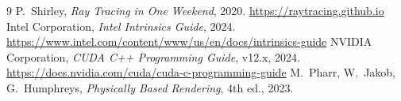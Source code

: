 \documentclass[conference]{IEEEtran}
\begin{document}
\begin{thebibliography}{9}
  P.\ Shirley, \textit{Ray Tracing in One Weekend}, 2020.
  \url{https://raytracing.github.io}
  Intel Corporation, \textit{Intel Intrinsics Guide}, 2024.
  \url{https://www.intel.com/content/www/us/en/docs/intrinsics-guide}
  NVIDIA Corporation, \textit{CUDA C++ Programming Guide}, v12.x, 2024.
  \url{https://docs.nvidia.com/cuda/cuda-c-programming-guide}
  M.\ Pharr, W.\ Jakob, G.\ Humphreys, \textit{Physically Based Rendering}, 4th ed., 2023.
\end{thebibliography}
\end{document}
